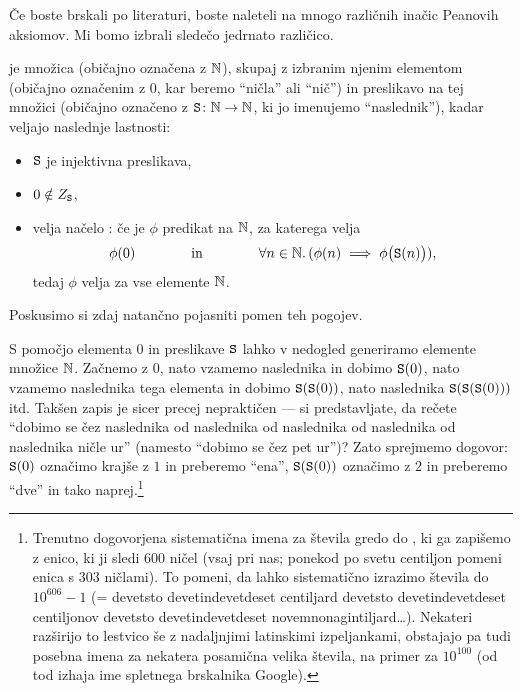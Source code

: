 Če boste brskali po literaturi, boste naleteli na mnogo različnih inačic Peanovih aksiomov. Mi bomo izbrali sledečo jedrnato različico.

\begin{definicija}[Peano]\label{definicija:naravna-stevila}
 je množica (običajno označena z $\mathbb{N}$), skupaj z izbranim njenim elementom (običajno označenim z $0$, kar beremo ``ničla'' ali ``nič'') in preslikavo na tej množici (običajno označeno z $\mathtt{S}\colon \mathbb{N} \to \mathbb{N}$, ki jo imenujemo ``naslednik''), kadar veljajo naslednje lastnosti:
\begin{itemize}
\item
$\mathtt{S}$ je injektivna preslikava,
\item
$0 \notin Z_{\mathtt{S}}$,
\item
velja načelo : če je $\phi$ predikat na $\mathbb{N}$, za katerega velja
\[\phi(0) \qquad\qquad \text{in} \qquad\qquad \forall n \in \mathbb{N} .\, (\phi(n) \implies \phi\big(\mathtt{S}(n)\big)),\]
tedaj $\phi$ velja za vse elemente $\mathbb{N}$.
\end{itemize}
\end{definicija}

Poskusimo si zdaj natančno pojasniti pomen teh pogojev.

S pomočjo elementa $0$ in preslikave $\mathtt{S}$ lahko v nedogled generiramo elemente množice $\mathbb{N}$. Začnemo z $0$, nato vzamemo naslednika in dobimo $\mathtt{S}(0)$, nato vzamemo naslednika tega elementa in dobimo $\mathtt{S}(\mathtt{S}(0))$, nato naslednika $\mathtt{S}(\mathtt{S}(\mathtt{S}(0)))$ itd. Takšen zapis je sicer precej nepraktičen --- si predstavljate, da rečete ``dobimo se čez naslednika od naslednika od naslednika od naslednika od naslednika ničle ur'' (namesto ``dobimo se čez pet ur'')? Zato sprejmemo dogovor: $\mathtt{S}(0)$ označimo krajše z $1$ in preberemo ``ena'', $\mathtt{S}(\mathtt{S}(0))$ označimo z $2$ in preberemo ``dve'' in tako naprej.\footnote{Trenutno dogovorjena sistematična imena za števila gredo do , ki ga zapišemo z enico, ki ji sledi 600 ničel (vsaj pri nas; ponekod po svetu centiljon pomeni enica s 303 ničlami). To pomeni, da lahko sistematično izrazimo števila do $10^{606}-1$ (= devetsto devetindevetdeset centiljard devetsto devetindevetdeset centiljonov devetsto devetindevetdeset novemnonagintiljard\ldots). Nekateri razširijo to lestvico še z nadaljnjimi latinskimi izpeljankami, obstajajo pa tudi posebna imena za nekatera posamična velika števila, na primer  za $10^{100}$ (od tod izhaja ime spletnega brskalnika Google).}

